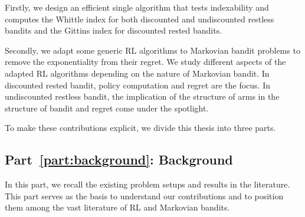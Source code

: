 
Firstly, we design an efficient single algorithm that tests indexability and computes the Whittle index for both discounted and undiscounted restless bandits and the Gittins index for discounted rested bandits.

Secondly, we adapt some generic RL algorithms to Markovian bandit problems to remove the exponentiality from their regret.
We study different aspects of the adapted RL algorithms depending on the nature of Markovian bandit. In discounted rested bandit, policy computation and regret are the focus. In undiscounted restless bandit, the implication of the structure of arms in the structure of bandit and regret come under the spotlight.

To make these contributions explicit, we divide this thesis into three parts.

\subsection{Part~{\ref{part:background}}: Background}

In this part, we recall the existing problem setups and results in the literature.
This part serves as the basis to understand our contributions and to position them among the vast literature of RL and Markovian bandits.

